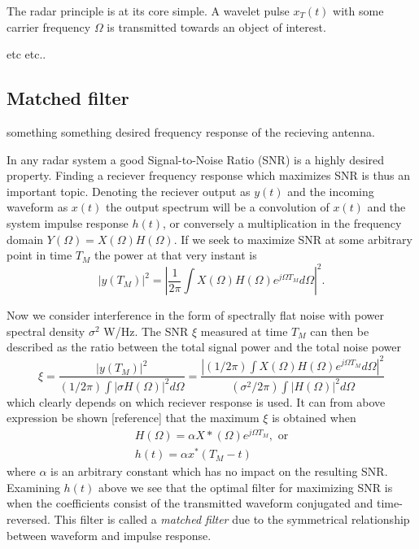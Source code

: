 \documentclass[a4paper, 12pt]{article}
\begin{document}
The radar principle is at its core simple.  A wavelet pulse $x_T(t)$ with some carrier frequency $\Omega$  is transmitted towards an object of interest. 

etc etc..


\subsection{Matched filter}

something something desired frequency response of the recieving antenna. 

In any radar system a good Signal-to-Noise Ratio (SNR) is a highly desired property. Finding a reciever frequency response which maximizes SNR is thus an important topic. Denoting the reciever output as $y(t)$ and the incoming waveform as $x(t)$ the output spectrum will be a convolution of $x(t)$ and the system impulse response $h(t)$, or conversely a multiplication in the frequency domain $Y(\Omega) = X(\Omega)H(\Omega)$. If we seek to maximize SNR at some arbitrary point in time $T_M$ the power at that very instant is
%
\begin{equation}
	|y(T_M)|^{2} = |\frac{1}{2\pi}\int X(\Omega)H(\Omega)e^{j\Omega T_M} d\Omega|^{2}.
\end{equation}

Now we consider interference in the form of spectrally flat noise with power spectral density $\sigma^2$ W/Hz. The SNR $\xi$ measured at time $T_M$ can then be described as the ratio between the total signal power and the total noise power
%
\begin{equation}
	\xi
	= \frac{|y(T_M)|^{2}}{(1/2\pi)\int|\sigma H(\Omega)|^{2}d\Omega}
	= \frac{|(1/2\pi)\int X(\Omega)H(\Omega)e^{j\Omega T_M}d\Omega|^2}{(\sigma^2/2\pi)\int|H(\Omega)|^{2}d\Omega}
\end{equation}
%
which clearly depends on which reciever response is used. It can from above expression be shown [reference] that the maximum $\xi$ is obtained when 
%
\begin{gather}
 H(\Omega) = \alpha X*(\Omega)e^{j\Omega T_M}, \text{ or} \\
\label{eq:123}
h(t) = \alpha x^*(T_M - t)
\end{gather}
%
where $\alpha$ is an arbitrary constant which has no impact on the resulting SNR. Examining $h(t)$ above we see that the optimal filter for maximizing SNR is when the coefficients consist of the transmitted waveform conjugated and time-reversed. This filter is called a \emph{matched filter} due to the symmetrical relationship between waveform and impulse response.
\end{document}

